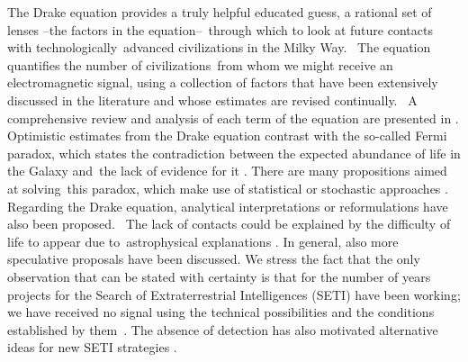\documentclass[crop]{CSLB}
\begin{document}
The Drake equation  \citep{drake_intelligent_1962} provides a truly
helpful educated guess, a rational set of lenses –the factors in the
equation– through which to look at future contacts with
technologically advanced civilizations in the Milky Way. 
%
The equation quantifies the number of civilizations from whom we might
receive an electromagnetic signal, using a collection of factors that
have been extensively discussed in the literature and whose estimates
are revised continually. 
%
A comprehensive review and analysis of each term of the equation are
presented in \citet{vakoch_drake_2015}.
%
Optimistic estimates from the Drake equation contrast with the
so-called Fermi paradox, which states the contradiction between the
expected abundance of life in the Galaxy and the lack of evidence for
it \citep[e.g. ][]{hart_explanation_1975, brin_great_1983,
barlow_galactic_2012, forgan_galactic_2016, vanhouten_isthere_2017,
Sotos_biotechnology_2019, carroll_nellemback_fermi_2019}.
%
There are many propositions aimed at solving this paradox, which make
use of statistical \citep{solomonides_probabilistic_2016,
vanhouten_isthere_2017, horvat_calculating_2007,
maccone_statistical_2015} or stochastic approaches
\citep{forgan_numerical_2009, bloetscher_using_2019,
glade_stochastic_2011, forgan_numerical_2010}.
%
Regarding the Drake equation, analytical interpretations
\citep{prantzos_joint_2013, smith_broadcasting_2009} or reformulations
\citep[][and references therein]{burchell_whither_2006} have also been
proposed. 
%
The lack of contacts could be explained by the difficulty of life to
appear due to astrophysical explanations
\citep{annis_astrophysical_1999}.
%
In general, also more speculative proposals
\citep{barlow_galactic_2013, lampton_information_2013,
conway_three_2018, forgan_galactic_2017} have been discussed.
% 
% 
% 
% 
\Fpagebreak
%
We stress the fact that the only observation that can be stated with
certainty is that for the number of years projects for the Search of
Extraterrestrial Intelligences (SETI) have been working; we have
received no signal using the technical possibilities and the
conditions established by them \citep{tarter_search_2001}.
%
The absence of detection has also motivated alternative ideas for new
SETI strategies \citep{forgan_exoplanet_2017, balbi_impact_2018,
loeb_eavesdropping_2006, maccone_KLT_2010, tarter_advancing_2009,
enriquez_breakthrough_2017, loeb_relative_2016, maccone_SETI_2011,
lingam_relative_2019, wright_theGsearch_2015, maccone_SETI_2013,
maccone_lognormals_2014, harp_application_2018,
forgan_possibility_2013, forgan_galactic_2017, funes_searching_2019}.
\end{document}
